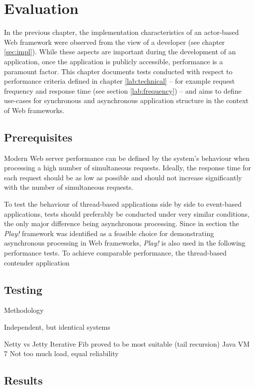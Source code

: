 \chapter{Evaluation}

In the previous chapter, the implementation characteristics of an actor-based Web framework were observed from the view of a developer (see chapter \ref{sec:impl}). While these aspects are important during the development of an application, once the application is publicly accessible, performance is a paramount factor. This chapter documents tests conducted with respect to performance criteria defined in chapter \ref{lab:technical} -- for example request frequency and response time (see section \ref{lab:frequency}) -- and aims to define use-cases for synchronous and asynchronous application structure in the context of Web frameworks.

\section{Prerequisites}

Modern Web server performance can be defined by the system's behaviour when processing a high number of simultaneous requests. Ideally, the response time for each request should be as low as possible and should not increase significantly with the number of simultaneous requests. 

To test the behaviour of thread-based applications side by side to event-based applications, tests should preferably be conducted under very similar conditions, the only major difference being asynchronous processing. Since in section \label{lab:lang} the \textit{Play!} framework was identified  as a feasible choice for demonstrating asynchronous processing in Web frameworks, \textit{Play!} is also used in the following performance tests. To achieve comparable performance, the thread-based contender application 

\section{Testing}

Methodology


Independent, but identical systems

Netty vs Jetty
Iterative Fib proved to be most suitable (tail recursion)
Java VM 7
Not too much load, equal reliability

\section{Results}

